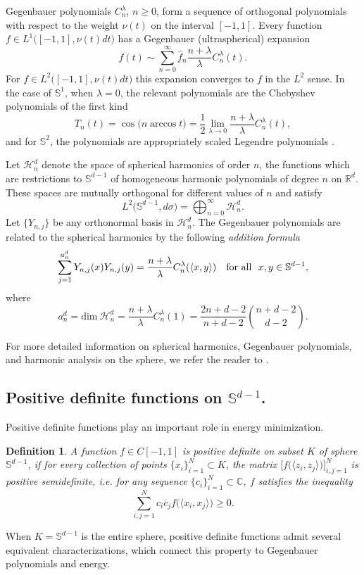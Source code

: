\documentclass[11pt, leqno]{amsart}
\def\C{\mathbb C}
\def\R{\mathbb R}
\def\S{\mathbb S}
\newtheorem{definition}[theorem]{Definition}
\theoremstyle{definition}
\numberwithin{equation}{section}
\begin{document}
Gegenbauer polynomials $C_n^\lambda$, $n\ge 0$,  form a  sequence of   orthogonal polynomials with respect to the weight $\nu(t)$ on the interval $[-1,1]$. Every function $f \in L^1 \big([-1,1], \nu(t)dt \big)$ has a Gegenbauer (ultraspherical) expansion
\begin{equation}\label{eq:expansion}
f(t) \sim \sum_{n=0}^\infty \widehat{f}_n  \frac{n+\lambda}{\lambda} C_n^\lambda (t).
\end{equation}
For $ f \in L^2 \big([-1,1], \nu(t)dt \big)$ this expansion converges to $f$ in the $L^2$ sense. In the case of $\S^1$, when $\lambda = 0$, the relevant polynomials are the Chebyshev polynomials of the first kind
\begin{equation}
T_n (t) = \cos \big( n \arccos t \big) = \frac12 \lim_{\lambda \rightarrow 0}  \frac{n+\lambda}{\lambda} C_n^\lambda (t),
\end{equation}
and for $\S^2$, the polynomials are appropriately scaled Legendre polynomials \cite{szego}.


Let $\mathcal H_n^d$ denote the space of spherical harmonics of order $n$, the functions which are restrictions to $\S^{d-1}$ of homogeneous harmonic polynomials of degree $n$  on $\R^d$. These spaces are mutually orthogonal  for different values of $n$ and satisfy $$ L^2 \big( \S^{d-1}, d\sigma \big)  = \bigoplus_{n=0}^\infty \mathcal H_n^d. $$
Let $\{ Y_{n,j} \}$  be any orthonormal basis in $\mathcal H_n^d$. The Gegenbauer polynomials are related to the spherical harmonics by the following  {\em{addition formula}} 
\begin{equation}\label{eq:add}
    \sum_{j=1}^{a_n^d} Y_{n,j}(x) Y_{n,j}(y) = \frac{n+\lambda}{\lambda} C_n^\lambda(\langle x,  y\rangle)\   \ \textup{ for all }\,\, x,y\in \S^{d-1},
\end{equation}
where  $$ a_n^d  = \text{dim}\ \mathcal{H}_n^d =\frac{n+\lambda}{\lambda} C_n^\lambda(1) = %
 \frac{2n+d-2}{n+d-2} {{n+d-2} \choose {d-2}} .$$

For more detailed information on spherical harmonics, Gegenbauer polynomials, and harmonic analysis on the sphere, we refer the reader to \cite{daiApproximation2013,mullerSpherical2007}.

\subsection{Positive definite functions on $\S^{d-1}$.}  Positive definite functions play an important role in energy minimization.
\begin{definition}\label{def:pd}
A function  $f \in C [-1,1]$ is positive definite on subset $K$ of sphere $\S^{d-1}$, if for every collection of points $\{x_i \}_{i=1}^N \subset K$, the matrix $ \big[ f \big( \langle z_i, z_j  \rangle \big) \big]_{i,j=1}^N$ is positive semidefinite, i.e. for any  sequence $\{c_i\}_{i=1}^N\subset \C$, $f$ satisfies the inequality $$ \sum\limits_{i,j=1}^N c_i\overline{c}_j f \big( \langle x_i, x_j  \rangle \big)\geq 0.$$
\end{definition}
When $K=\S^{d-1}$ is the entire sphere, positive definite functions admit several equivalent characterizations, which connect this property to Gegenbauer polynomials and energy. 
\end{document}
